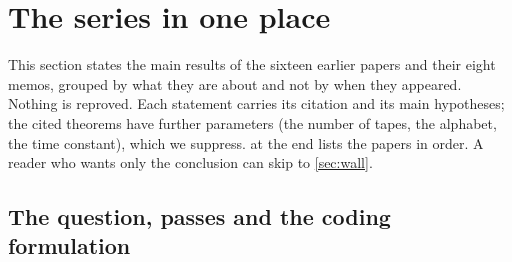 \section{The series in one place}\label{sec:series}

This section states the main results of the sixteen earlier papers and their eight memos, grouped by what they are about
and not by when they appeared. Nothing is reproved. Each statement carries its citation and its main hypotheses; the
cited theorems have further parameters (the number of tapes, the alphabet, the time constant), which we suppress.
 at the end lists the papers in order. A reader who wants only the conclusion can skip to
\cref{sec:wall}.

\subsection{The question, passes and the coding formulation}\label{sec:first}


